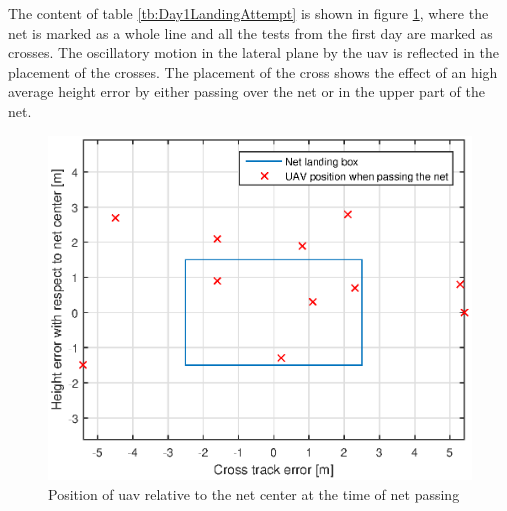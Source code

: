 The content of table \ref{tb:Day1LandingAttempt} is shown in figure \ref{Fig:Day1NetPass}, where the net is marked as a whole line and all the tests from the first day are marked as crosses. The oscillatory motion in the lateral plane by the \gls{uav} is reflected in the placement of the crosses. The placement of the cross shows the effect of an high average height error by either passing over the net or in the upper part of the net.
\newpage
\begin{figure}[H]
\centering
\includegraphics[scale=0.7]{figs/Experiment/day1NetHit.eps}
\caption{Position of \gls{uav} relative to the net center at the time of net passing}
\label{Fig:Day1NetPass}
\end{figure}
